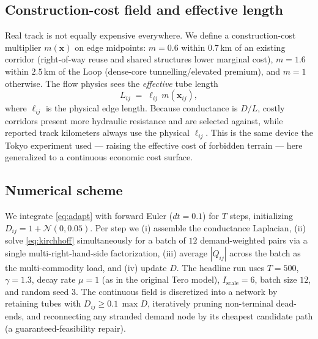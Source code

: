 \documentclass[11pt]{article}
\newcommand{\D}{D}
\begin{document}
\subsection{Construction-cost field and effective length}
Real track is not equally expensive everywhere. We define a construction-cost multiplier
$m(\mathbf{x})$ on edge midpoints: $m=0.6$ within $0.7$\,km of an existing corridor
(right-of-way reuse and shared structures lower marginal cost), $m=1.6$ within $2.5$\,km of
the Loop (dense-core tunnelling/elevated premium), and $m=1$ otherwise. The flow physics
sees the \emph{effective} tube length
\begin{equation}
L_{ij} \;=\; \ell_{ij}\, m(\mathbf{x}_{ij}),
\label{eq:Leff}
\end{equation}
where $\ell_{ij}$ is the physical edge length. Because conductance is $\D/L$, costly
corridors present more hydraulic resistance and are selected against, while reported track
kilometers always use the physical $\ell_{ij}$. This is the same device the Tokyo
experiment used --- raising the effective cost of forbidden terrain --- here generalized to
a continuous economic cost surface.

\subsection{Numerical scheme}
We integrate \eqref{eq:adapt} with forward Euler ($dt=0.1$) for $T$ steps, initializing
$\D_{ij}=1+\mathcal{N}(0,0.05)$. Per step we (i) assemble the conductance Laplacian, (ii)
solve \eqref{eq:kirchhoff} simultaneously for a batch of $12$ demand-weighted pairs via a
single multi-right-hand-side factorization, (iii) average $|Q_{ij}|$ across the batch as the
multi-commodity load, and (iv) update $\D$. %
The headline run uses $T=500$, $\gamma=1.3$, decay rate $\mu=1$ (as in the original Tero
model), $I_{\text{scale}}=6$, batch size $12$, and random seed $3$. The continuous field is discretized into a network by retaining tubes
with $\D_{ij}\ge 0.1\,\max\D$, iteratively pruning non-terminal dead-ends, and reconnecting
any stranded demand node by its cheapest candidate path (a guaranteed-feasibility repair).
\end{document}
